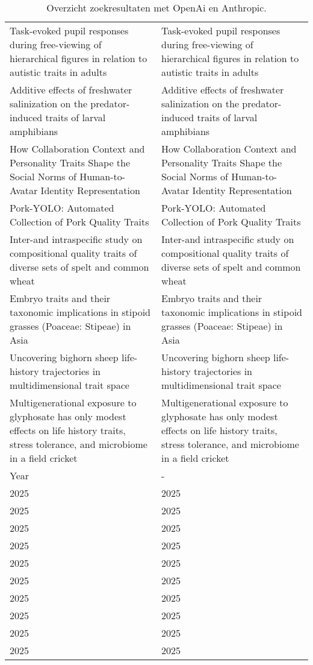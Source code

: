 \begin{table}[ptb]
\begin{tabular}{ | m{7.5cm} | m{7.5cm}| }
        Task-evoked pupil responses during free-viewing of hierarchical figures in relation to autistic traits in adults & Task-evoked pupil responses during free-viewing of hierarchical figures in relation to autistic traits in adults \\
        Additive effects of freshwater salinization on the predator-induced traits of larval amphibians & Additive effects of freshwater salinization on the predator-induced traits of larval amphibians \\
        How Collaboration Context and Personality Traits Shape the Social Norms of Human-to-Avatar Identity Representation & How Collaboration Context and Personality Traits Shape the Social Norms of Human-to-Avatar Identity Representation \\
        Pork-YOLO: Automated Collection of Pork Quality Traits & Pork-YOLO: Automated Collection of Pork Quality Traits \\
        Inter-and intraspecific study on compositional quality traits of diverse sets of spelt and common wheat & Inter-and intraspecific study on compositional quality traits of diverse sets of spelt and common wheat \\
        Embryo traits and their taxonomic implications in stipoid grasses (Poaceae: Stipeae) in Asia & Embryo traits and their taxonomic implications in stipoid grasses (Poaceae: Stipeae) in Asia \\
        Uncovering bighorn sheep life-history trajectories in multidimensional trait space & Uncovering bighorn sheep life-history trajectories in multidimensional trait space \\
        Multigenerational exposure to glyphosate has only modest effects on life history traits, stress tolerance, and microbiome in a field cricket & Multigenerational exposure to glyphosate has only modest effects on life history traits, stress tolerance, and microbiome in a field cricket \\
        \hline
        \rowcolor{lightgray}
        Year & - \\ 
        \hline
        2025 & 2025 \\ 
        2025 & 2025 \\
        2025 & 2025 \\
        2025 & 2025 \\
        2025 & 2025 \\
        2025 & 2025 \\
        2025 & 2025 \\
        2025 & 2025 \\
        2025 & 2025 \\
        2025 & 2025 \\
        \hline
    \end{tabular}
    \caption{Overzicht zoekresultaten met OpenAi en Anthropic.}
\end{table}
